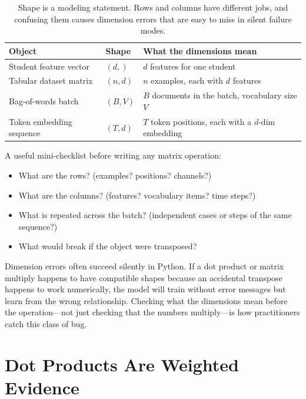 \begin{table}[t]
\centering
\small
\setlength{\tabcolsep}{4pt}
\begin{tabular}{p{2.72cm}p{2.38cm}p{4.85cm}}
\toprule
Object & Shape & What the dimensions mean \\
\midrule
Student feature vector & $(d,)$ & $d$ features for one student \\
Tabular dataset matrix & $(n, d)$ & $n$ examples, each with $d$ features \\
Bag-of-words batch & $(B, V)$ & $B$ documents in the batch, vocabulary size $V$ \\
Token embedding sequence & $(T, d)$ & $T$ token positions, each with a $d$-dim embedding \\
\bottomrule
\end{tabular}
\caption{Shape is a modeling statement. Rows and columns have different jobs, and confusing them causes dimension errors that are easy to miss in silent failure modes.}
\label{tab:shape-meanings}
\end{table}

A useful mini-checklist before writing any matrix operation:
\begin{itemize}[leftmargin=*]
\item What are the rows? (examples? positions? channels?)
\item What are the columns? (features? vocabulary items? time steps?)
\item What is repeated across the batch? (independent cases or steps of the same sequence?)
\item What would break if the object were transposed?
\end{itemize}

\begin{failurebox}
Dimension errors often succeed silently in Python. If a dot product or matrix multiply happens to have compatible shapes because an accidental transpose happens to work numerically, the model will train without error messages but learn from the wrong relationship. Checking what the dimensions mean before the operation---not just checking that the numbers multiply---is how practitioners catch this class of bug.
\end{failurebox}

\section*{Dot Products Are Weighted Evidence}


